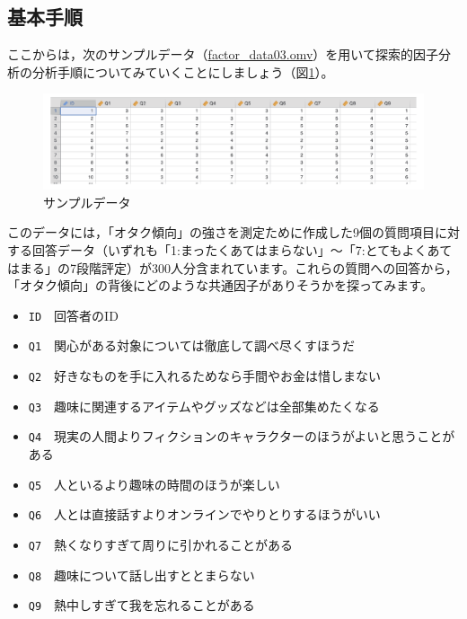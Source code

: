 \documentclass[
  12pt,
  a5jpaper,
  lualatex, ja=standard]{bxjsbook}
\providecommand{\tightlist}{%
  \setlength{\itemsep}{0pt}\setlength{\parskip}{0pt}}
\newenvironment{jmvvar}{%
	\begin{center}%
	\begin{tcolorbox}[%
		title=変数一覧,
		colframe=daidai,
		colbacktitle=daidai!30!white,
		coltitle=daidai!10!black,
		colback=daidai!2!white,
		breakable,
		width=.9\textwidth
		]\small\addtolength{\leftmargini}{-3\labelsep}%
	}%
	{\end{tcolorbox}\end{center}}
\begin{document}
\hypertarget{sub:factor-efa-procedure}{%
\subsection{基本手順}\label{sub:factor-efa-procedure}}

ここからは，次のサンプルデータ（\href{https://github.com/sbtseiji/jmv_compguide/raw/main/data/omv/factor_data03.omv}{factor\_data03.omv}）を用いて探索的因子分析の分析手順についてみていくことにしましょう（図\ref{fig:factor-data03}）。

\begin{figure}[!ht]

{\centering \includegraphics[width=1\linewidth]{images/factor/data03} 

}

\caption{サンプルデータ}\label{fig:factor-data03}
\end{figure}

このデータには，「オタク傾向」の強さを測定ために作成した9個の質問項目に対する回答データ（いずれも「1:まったくあてはまらない」〜「7:とてもよくあてはまる」の7段階評定）が300人分含まれています。これらの質問への回答から，「オタク傾向」の背後にどのような共通因子がありそうかを探ってみます。

\begin{jmvvar}

\begin{itemize}
\tightlist
\item
  \texttt{ID}　回答者のID
\item
  \texttt{Q1}　関心がある対象については徹底して調べ尽くすほうだ
\item
  \texttt{Q2}　好きなものを手に入れるためなら手間やお金は惜しまない
\item
  \texttt{Q3}　趣味に関連するアイテムやグッズなどは全部集めたくなる
\item
  \texttt{Q4}　現実の人間よりフィクションのキャラクターのほうがよいと思うことがある
\item
  \texttt{Q5}　人といるより趣味の時間のほうが楽しい
\item
  \texttt{Q6}　人とは直接話すよりオンラインでやりとりするほうがいい
\item
  \texttt{Q7}　熱くなりすぎて周りに引かれることがある
\item
  \texttt{Q8}　趣味について話し出すととまらない
\item
  \texttt{Q9}　熱中しすぎて我を忘れることがある
\end{itemize}

\end{jmvvar}
\end{document}
